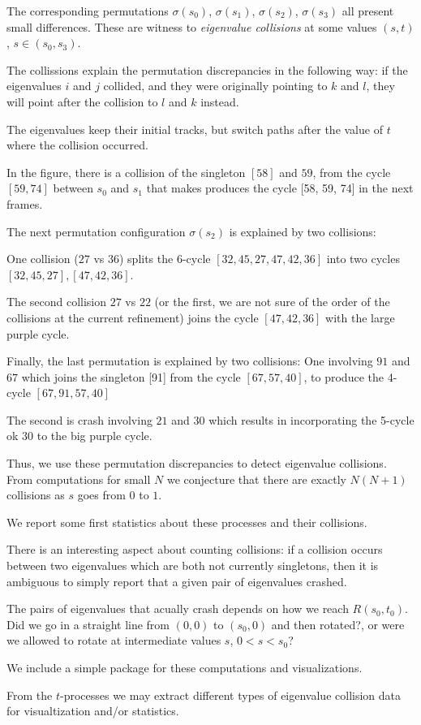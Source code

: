 \documentclass{article}
\begin{document}
	The corresponding permutations $\sigma(s_0)$, $\sigma(s_1)$, $\sigma(s_2)$, $\sigma(s_3)$ 
	all present small differences. 
	These are witness to \emph{eigenvalue collisions} 
	at some values $(s,t)$, $s \in (s_0, s_3)$.

	The collissions explain the permutation discrepancies in the following way: 
	if the eigenvalues $i$ and $j$ collided, 
	and they were originally pointing to $k$ and $l$, they will point after the collision 
	to $l$ and $k$ instead.
	
	The eigenvalues keep their initial tracks, 
	but switch paths after the value of $t$ where the collision occurred. 

	In the figure, there is a collision of the singleton $[58]$ and $59$, from the cycle $[59, 74]$ 
	between $s_0$ and $s_1$ 
	that makes produces the cycle [58, 59, 74] in the next frames.

	The next permutation configuration $\sigma(s_2)$ is explained by two collisions: 

	One collision ($27$ vs $36$) splits the 6-cycle $[32, 45, 27, 47, 42, 36]$ into two cycles 
	$[32, 45, 27], [47, 42, 36]$.

	The second collision $27$ vs $22$ (or the first, we are not sure of the order of the collisions 
	at the current refinement) joins the cycle $[47, 42, 36]$ with the large purple cycle.

	Finally, the last permutation is explained by two collisions: 
	One involving $91$ and $67$
	which joins the singleton [91] 
	from the cycle $[67, 57, 40]$, 
	to produce the 4-cycle $[67, 91, 57, 40]$

	The second is crash involving $21$ and $30$ which results in incorporating the 5-cycle ok $30$ 
	to the big purple cycle.

	Thus, we use these permutation discrepancies to detect eigenvalue collisions. 
	From computations for small $N$ we conjecture that there are exactly $N(N+1)$ 
	collisions as $s$ goes from $0$ to $1$. 

	We report some first statistics about these processes and their collisions.

	There is an interesting aspect about counting collisions: if a collision occurs 
	between two eigenvalues which are both not currently singletons, 
	then it is ambiguous to simply report that a given pair of eigenvalues crashed.
	
	The pairs of eigenvalues that acually crash depends on how we reach $R(s_0,t_0)$.
	Did we go in a straight line from $(0,0)$ to $(s_0,0)$ and then rotated?, or were we allowed
	to rotate at intermediate values $s$, $0 < s < s_0$?

	We include a simple package for these computations and visualizations. 
	
	From the $t$-processes we may extract different types of eigenvalue collision data
	for visualtization and/or statistics.
\end{document}
